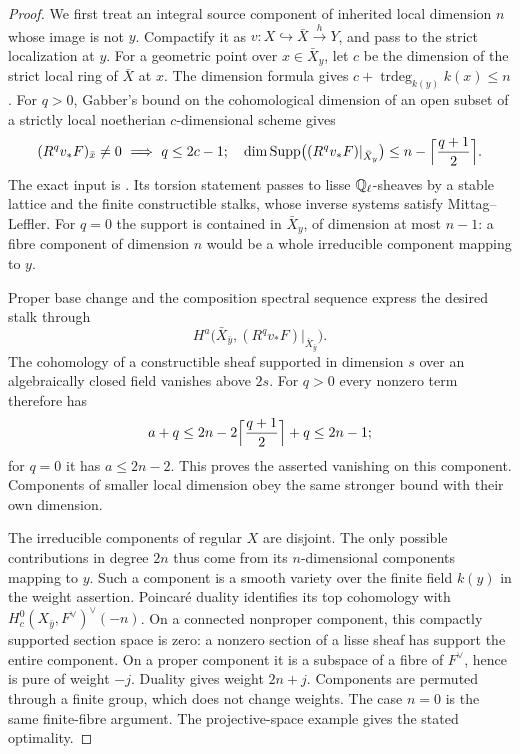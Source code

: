 \begin{proof}
We first treat an integral source component of inherited local dimension $n$ whose image is not $y$. Compactify it as $v:X\hookrightarrow\bar X\xrightarrow{h}Y$, and pass to the strict localization at $y$. For a geometric point over $x\in\bar X_y$, let $c$ be the dimension of the strict local ring of $\bar X$ at $x$. The dimension formula gives $c+\operatorname{trdeg}_{k(y)}k(x)\leq n$. For $q>0$, Gabber's bound on the cohomological dimension of an open subset of a strictly local noetherian $c$-dimensional scheme gives
\[
 (R^qv_*F)_{\bar x}\ne0\ \Longrightarrow\ q\leq2c-1;
 \quad
 \dim\operatorname{Supp}\bigl((R^qv_*F)|_{\bar X_y}\bigr)
 \leq n-\Bigl\lceil\frac{q+1}{2}\Bigr\rceil.
\]
The exact input is \citet[Theorem 1.1, formula (1.1.1), p.~455]{c_illusie2014cd}. Its torsion statement passes to lisse $\mathbb Q_\ell$-sheaves by a stable lattice and the finite constructible stalks, whose inverse systems satisfy Mittag--Leffler. For $q=0$ the support is contained in $\bar X_y$, of dimension at most $n-1$: a fibre component of dimension $n$ would be a whole irreducible component mapping to $y$.

Proper base change and the composition spectral sequence express the desired stalk through
\[
 H^a\bigl(\bar X_{\bar y},(R^qv_*F)|_{\bar X_{\bar y}}\bigr).
\]
The cohomology of a constructible sheaf supported in dimension $s$ over an algebraically closed field vanishes above $2s$. For $q>0$ every nonzero term therefore has
\[
 a+q\leq2n-2\Bigl\lceil\frac{q+1}{2}\Bigr\rceil+q\leq2n-1;
\]
for $q=0$ it has $a\leq2n-2$. This proves the asserted vanishing on this component. Components of smaller local dimension obey the same stronger bound with their own dimension.

The irreducible components of regular $X$ are disjoint. The only possible contributions in degree $2n$ thus come from its $n$-dimensional components mapping to $y$. Such a component is a smooth variety over the finite field $k(y)$ in the weight assertion. Poincar\'e duality identifies its top cohomology with $H^0_c(X_{\bar y},F^\vee)^\vee(-n)$. On a connected nonproper component, this compactly supported section space is zero: a nonzero section of a lisse sheaf has support the entire component. On a proper component it is a subspace of a fibre of $F^\vee$, hence is pure of weight $-j$. Duality gives weight $2n+j$. Components are permuted through a finite group, which does not change weights. The case $n=0$ is the same finite-fibre argument. The projective-space example gives the stated optimality.
\end{proof}

